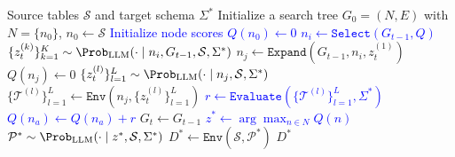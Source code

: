 
\begin{algorithm}[t]
\small
\caption{Direct MCTS Adaptation for Data Preparation}
\label{alg:mcts}
\begin{algorithmic}[1]
\Require Source tables $\mathcal{S}$ and target schema $\Sigma^*$
\State Initialize a search tree $G_0=(N,E)$ with $N=\{n_0\}$, $n_0 \leftarrow \mathcal{S}$
\State \textcolor{blue}{Initialize node scores $Q(n_0) \leftarrow 0$}
    \State \textcolor{blue}{$n_i \leftarrow \mathtt{Select}(G_{t-1}, Q)$}
    \State $\{z_{t}^{(k)}\}_{k=1}^{K} \sim \Prob_{\text{LLM}}(\cdot \mid n_i, G_{t-1}, \mathcal{S}, \Sigma^*)$
    \State $n_j \leftarrow \mathtt{Expand}(G_{t-1}, n_i, z_{t}^{(1)})$
    \State $Q(n_j) \leftarrow 0$
    \State $\{z_{t}^{(l)}\}_{l=1}^{L} \sim \Prob_{\text{LLM}}(\cdot \mid n_j, \mathcal{S}, \Sigma^*)$
    \State $\{\mathcal{T}^{(l)}\}_{l=1}^{L} \leftarrow \mathtt{Env}(n_j, \{z_{t}^{(l)}\}_{l=1}^{L})$
    \State \textcolor{blue}{$r \leftarrow \mathtt{Evaluate}(\{\mathcal{T}^{(l)}\}_{l=1}^{L}, \Sigma^*)$}
        \State \textcolor{blue}{$Q(n_a) \leftarrow Q(n_a) + r$}
    \EndFor
    \State $G_t \leftarrow G_{t-1}$
\EndWhile
\State \textcolor{blue}{$z^* \leftarrow \arg\max_{n \in N} Q(n)$}
\State $\mathcal{P}^* \sim \Prob_{\text{LLM}}(\cdot \mid z^*, \mathcal{S}, \Sigma^*)$
\State $D^* \leftarrow \mathtt{Env}(\mathcal{S}, \mathcal{P}^*)$
\State \Return $D^*$
\end{algorithmic}
\end{algorithm}
